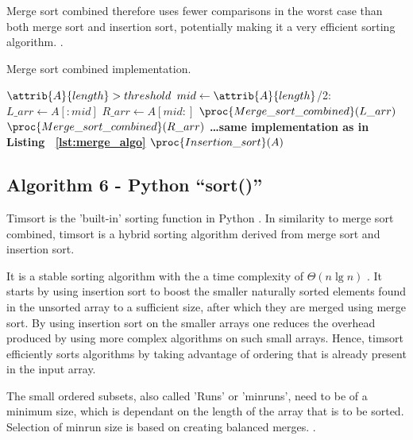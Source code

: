 \documentclass[sigconf, nonacm, natbib, screen, balance=False]{acmart}
\begin{document}
Merge sort combined therefore uses fewer comparisons in the worst case than both merge sort and insertion sort, potentially making it a very efficient sorting algorithm.  \cite{Mergeins20:online}.  

\begin{listing}
  \caption{Merge sort combined implementation.}
  \label{lst:mergecombined_algo}
  
 \begin{codebox}
    \li \If $\attrib{A}{length} > threshold$
    \li \Do
    $mid \gets \attrib{A}{length}$/2: 
    \li $L\_arr\gets A[:mid]$
    \li $R\_arr\gets A[mid:]$
    \li $\proc{Merge\_sort\_combined}(L\_arr)$
    \li $\proc{Merge\_sort\_combined}(R\_arr)$
    \li \textbf{\dots same implementation as in Listing ~\ref{lst:merge_algo}}
    \li \Else
    \li $\proc{Insertion\_sort}(A)$
  \end{codebox}
\end{listing}

\subsection{Algorithm 6 - Python ``sort()'' }\label{sec:algo6}

Timsort is the 'built-in' sorting function in Python \cite{TimsortW72:online}. In similarity to merge sort combined, timsort is a hybrid sorting algorithm derived from merge sort and insertion sort.

It is a stable sorting algorithm with the a time complexity of $\Theta(n\lg n)$ \cite{SortingA29:online}. It starts by using insertion sort to boost the smaller naturally sorted elements found in the unsorted array to a sufficient size, after which they are merged using merge sort. By using insertion sort on the smaller arrays one reduces the overhead produced by using more complex algorithms on such small arrays. Hence, timsort efficiently sorts algorithms by taking advantage of ordering that is already present in the input array.

The small ordered subsets, also called 'Runs' or 'minruns', need to be of a minimum size, which is dependant on the length of the array that is to be sorted. Selection of minrun size is based on creating balanced merges.  \cite{cpythonl70:online}.




\end{document}
